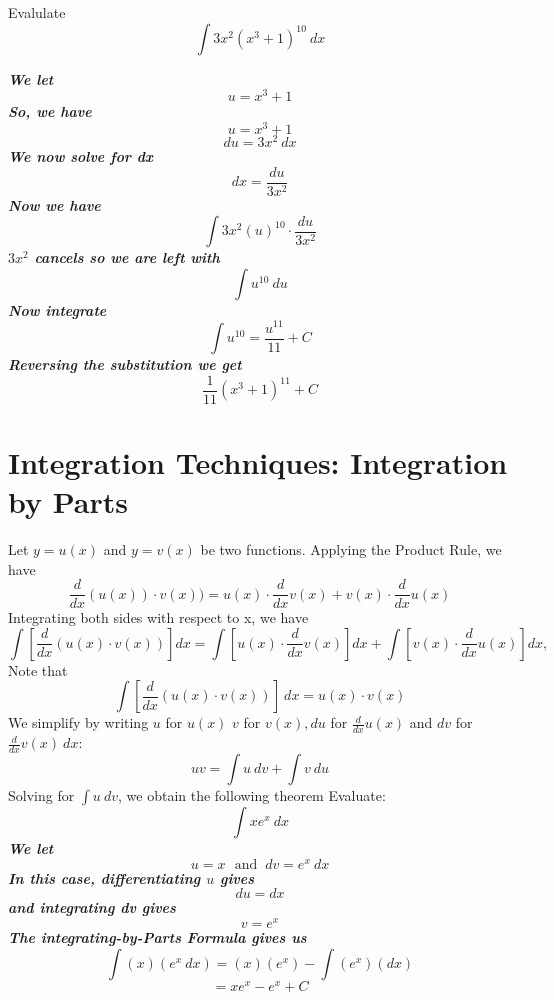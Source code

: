 \documentclass{report}
\begin{document}
\pagebreak
\noindent
\begin{mdframed}
\q
Evalulate
$$ \int 3x^2(x^3 +1)^{10}\ dx$$
\end{mdframed}
\bigbreak \noindent
\sol
\bigbreak \noindent
\textit{\textbf{We let}}
$$ u = x^3+1$$
\textit{\textbf{So, we have}}
$$ u = x^3 +1$$
$$ du = 3x^2\ dx$$
\textit{\textbf{We now solve for dx}}
$$ dx = \dfrac{du}{3x^2}$$
\textit{\textbf{Now we have}}
$$ \int 3x^2(u)^{10}\cdot \dfrac{du}{3x^2}$$
\textit{\textbf{$3x^2$ cancels so we are left with}}
$$\int{u^{10}}\ du$$
\textit{\textbf{Now integrate}}
$$ \int{u^{10}} = \dfrac{u^{11}}{11} + C$$
\textit{\textbf{Reversing the substitution we get}}
$$ \dfrac{1}{11} \left(x^3+1\right)^{11} + C$$
\bigbreak \noindent
\newpage
\section*{Integration Techniques: Integration by Parts}
Let $y=u(x)$ and $y=v(x)$ be two functions. Applying the Product Rule, we have
$$ \frac{d}{dx}(u(x)) \cdot v(x)) = u(x) \cdot \frac{d}{dx}v(x) +v(x) \cdot \frac{d}{dx}u(x)$$
Integrating both sides with respect to x, we have
$$
\int\left[\frac{d}{d x}(u(x) \cdot v(x))\right] d x=\int\left[u(x) \cdot \frac{d}{d x} v(x)\right] d x+\int\left[v(x) \cdot \frac{d}{d x} u(x)\right] d x,
$$
Note that 
$$\int\left[ \frac{d}{dx}(u(x)\cdot v(x))\right]\ dx = u(x) \cdot v(x)$$
We simplify by writing $u$ for $u(x)$
$v$ for $v(x), du$ for $ \frac{d}{dx}u(x)$ and $dv$ for $ \frac{d}{dx}v(x)\ dx$:
$$ uv = \int{u\ dv} + \int{v\ du}$$
Solving for $\int{u\ dv}$, we obtain the following theorem
\bigbreak \noindent
\q
Evaluate:
$$ \int{xe^x}\ dx$$
\sol
\textit{\textbf{We let}}
$$ u = x \ \ \ \text{and } \ dv = e^x\ dx$$
\textit{\textbf{In this case, differentiating $u$ gives}}
$$ du = dx$$
\textit{\textbf{and integrating dv gives}}
$$ v = e^x$$
\textit{\textbf{The integrating-by-Parts Formula gives us}}
$$ \int (x)(e^x\ dx) = (x)(e^x) - \int (e^x)(dx)$$
$$ = xe^x - e^x +C$$
\end{document}
